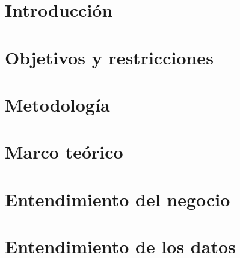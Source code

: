 \documentclass[11pt,twoside,draft]{report}
\begin{document}
    \chapter{Introducción}
    

    \chapter{Objetivos y restricciones}
    \label{Objs}
    

    \chapter{Metodología}
    

    \chapter{Marco teórico}
    \label{visglob}
    

    \chapter{Entendimiento del negocio}
    \label{crisp1}
    

    \chapter{Entendimiento de los datos}
    \label{crisp2}
    
    \cleardoublepage
\end{document}
